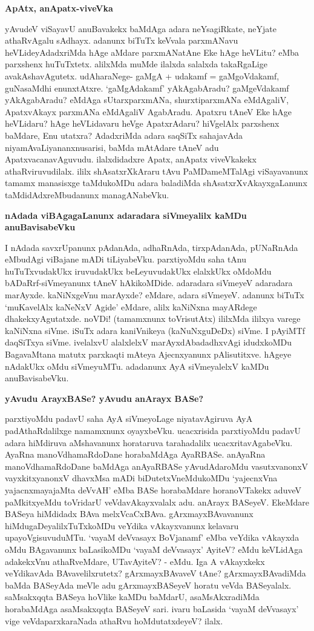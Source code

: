 {\bigskip
\noindent
{\large\bf ApAtx, anApatx-viveVka}}\label{page173}
\medskip

\noindent
yAvudeV viSayavU anuBavakekx baMdAga adara neYsagiRkate, neYjate athaRvAgalu sAdhayx. adanunx biTuTx keVvala parxmANavu heVLideyAdadxriMda hAge aMdare parxmANatAne Eke hAge heVLitu? eMba parxshenx huTuTxtetx. alilxMda muMde ilalxda salalxda takaRgaLige avakAshavAgutetx. udAharaNege- gaMgA + udakamf = gaMgoVdakamf, guNasaMdhi enunxtAtxre. `gaMgAdakamf' yAkAgabAradu? gaMgeVdakamf yAkAgabAradu? eMdAga sUtarxparxmANa, shurxtiparxmANa eMdAgaliV, ApatxvAkayx parxmANa eMdAgaliV AgabAradu. Apatxru tAneV Eke hAge heVLidaru? hAge heVLidavaru heVge ApatxrAdaru? hiVgelAlx parxshenx baMdare, Enu utatxra? AdadxriMda adara saqSiTx sahajavAda niyamAvaLiyananxnusarisi, baMda mAtAdare tAneV adu ApatxvacanavAguvudu. ilalxdidadxre Apatx, anApatx viveVkakekx athaRviruvudilalx. ililx shAsatxrXkAraru tAvu PaMDameMTalAgi viSayavanunx tamamx manasisxge taMdukoMDu adara baladiMda shAsatxrXvAkayxgaLanunx taMdidAdxreMbudanunx managANabeVku.

{\bigskip
\noindent
{\large\bf nAdada viBAgagaLanunx adaradara siVmeyalilx kaMDu anuBavisabeVku}}
\medskip

\noindent
I nAdada savxrUpanunx pAdanAda, adhaRnAda, tirxpAdanAda, pUNaRnAda eMbudAgi viBajane mADi tiLiyabeVku. parxtiyoMdu saha tAnu huTuTxvudakUkx iruvudakUkx beLeyuvudakUkx elalxkUkx oMdoMdu bADaRrf-siVmeyanunx tAneV hAkikoMDide. adaradara siVmeyeV adaradara marAyxde. kaNiNxgeVnu marAyxde? eMdare, adara siVmeyeV. adanunx biTuTx `muKavelAlx kaNeNxV Agide' eMdare, alilx kaNiNxna mayARdege dhakekxyAgutatxde. noVDi! (tamamxnunx toVrisutAtx) ililxMda ililxya varege kaNiNxna siVme. iSuTx adara kaniVnikeya (kaNuNxguDeDx) siVme. I pAyiMTf daqSiTxya siVme. ivelalxvU alalxlelxV marAyxdAbadadhxvAgi idudxkoMDu BagavaMtana matutx parxkaqti mAteya Ajecnxyanunx pAlisutitxve. hAgeye nAdakUkx oMdu siVmeyuMTu. adadanunx AyA siVmeyalelxV kaMDu anuBavisabeVku.

{\bigskip
\noindent
{\large\bf yAvudu ArayxBASe? yAvudu anArayx BASe?}}\label{page174}
\medskip

\noindent
parxtiyoMdu padavU saha AyA siVmeyoLage niyatavAgiruva AyA padAthaRdalilxge namamxnunx oyayxbeVku. ucacxrisida parxtiyoMdu padavU adara hiMdiruva aMshavanunx horataruva tarahadalilx ucacxritavAgabeVku. AyaRna manoVdhamaRdoDane horabaMdAga AyaRBASe. anAyaRna manoVdhamaRdoDane baMdAga anAyaRBASe yAvudAdaroMdu vasutxvanonxV vayxkitxyanonxV dhavxMsa mADi biDutetxVneMdukoMDu `yajecnxVna yajacnxmayajaMta \hbox{deVvAH}' eMba BASe horabaMdare horanoVTakekx aduveV paMkitxyeMdu toVridarU veVdavAkayxvalalx adu. anArayx BASeyeV. EkeMdare BASeya hiMdidadx BAva melxVcaCxBAva. gArxmayxBAvavanunx hiMdugaDeyalilxTuTxkoMDu veYdika vAkayxvanunx kelavaru upayoVgisuvuduMTu. `vayaM deVvasayx BoVjanamf' eMba veYdika vAkayxda oMdu BAgavanunx baLasikoMDu `vayaM deVvasayx' AyiteV? eMdu keVLidAga adakekxVnu athaRveMdare, UTavAyiteV? - eMdu. Iga A vAkayxkekx veYdikavAda BAvavelilxrutetx? gArxmayxBAvaveV tAne? gArxmayxBAvadiMda baMda BASeyAda meVle adu gArxmayxBASeyeV horatu veVda BASeyalalx. saMsakxqqta BASeya hoVlike kaMDu baMdarU, asaMsAkxradiMda horabaMdAga asaMsakxqqta BASeyeV sari. ivaru baLasida `vayaM deVvasayx' vige veVdaparxkaraNada athaRvu hoMdutatxdeyeV? ilalx.

